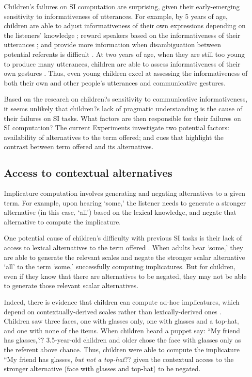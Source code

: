 \documentclass[10pt,letterpaper]{article}
\begin{document}
Children's failures on SI computation are surprising, given their early-emerging sensitivity to informativeness of utterances. For example, by 5 years of age, children are able to adjust informativeness of their own expressions depending on the listeners' knowledge \cite{matthews2006effect}; reward speakers based on the informativeness of their utterances \cite{katsos2011pragmatic}; and provide more information when disambiguation between potential referents is difficult \cite{matthews2012two}. At two years of age, when they are still too young to produce many utterances, children are able to assess informativeness of their own gestures \cite{o2001two}. Thus, even young children excel at assessing the informativeness of both their own and other people's utterances and communicative gestures. 

Based on the research on children?s sensitivity to communicative informativeness, it seems unlikely that children?s lack of pragmatic understanding is the cause of their failures on SI tasks. What factors are then responsible for their failures on SI computation? The current Experiments investigate two potential factors: availability of alternatives to the term offered; and cues that highlight the contrast between term offered and its alternatives. 

\subsection{Access to contextual alternatives}

Implicature computation involves generating and negating alternatives to a given term. For example, upon hearing `some,' the listener needs to generate a stronger alternative (in this case, `all') based on the lexical knowledge, and negate that alternative to compute the implicature.  

One potential cause of children's difficulty with previous SI tasks is their lack of access to lexical alternatives to the term offered \cite{barner2011accessing}. When adults hear `some,' they are able to generate the relevant scales and negate the stronger scalar alternative `all' to the term `some,' successfully computing implicatures. But for children, even if they know that there are alternatives to be negated, they may not be able to generate those relevant scalar alternatives. 

Indeed, there is evidence that children can compute ad-hoc implicatures, which depend on contextually-derived scales rather than lexically-derived ones \cite{stillerLLD} . Children saw three faces, one with glasses only, one with glasses and a top-hat, and one with none of the items. When children heard a puppet say: ``My friend has glasses,?? 3.5-year-old children and older chose the face with glasses only as the referent above chance. Thus, children were able to compute the implicature ``My friend has glasses, \emph{but not a top-hat}?? given the contextual access to the stronger alternative (face with glasses and top-hat) to be negated.
\end{document}
